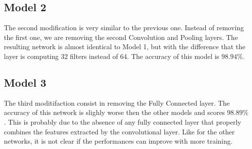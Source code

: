 \subsection{Model 2}

The second modification is very similar to the previous one. Instead of removing the first one, we are removing the second Convolution and Pooling layers.
The resulting network is almost identical to Model 1, but with the difference that the layer is computing 32 filters instead of 64.
The accuracy of this model is $98.94\%$.


\subsection{Model 3}

The third moditifaction consist in removing the Fully Connected layer.
The accuracy of this network is slighly worse then the other models and scores $98.89\%$.
This is probably due to the absence of any fully connected layer that properly combines the features extracted by the convolutional layer.
Like for the other networks, it is not clear if the performances can improve with more training.
